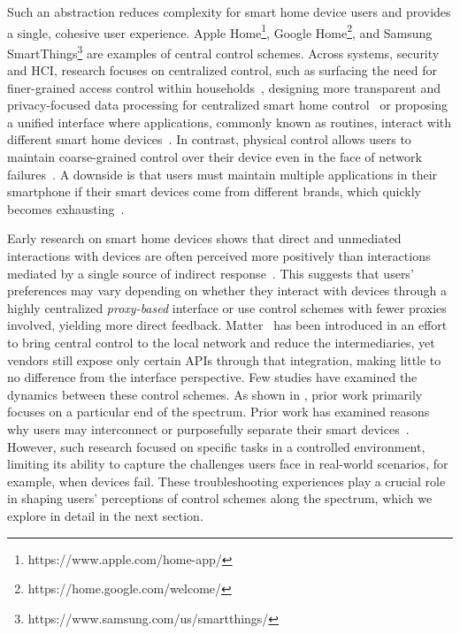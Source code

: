 Such an abstraction reduces complexity for smart home device users and provides a single, cohesive user experience. 
Apple Home\footnote{https://www.apple.com/home-app/}, Google Home\footnote{https://home.google.com/welcome/}, and Samsung SmartThings\footnote{https://www.samsung.com/us/smartthings/} are examples of central control schemes. Across systems, security and HCI, research focuses on centralized control, such as surfacing the need for finer-grained access control within households~\cite{sikder2022s}, designing more transparent and privacy-focused data processing for centralized smart home control~\cite{jin2022peekaboo} or proposing a unified interface where applications, commonly known as routines, interact with different smart home devices~\cite{HomeOS}.
{In contrast, physical control} allows users to maintain coarse-grained control over their device even in the face of network failures~\cite{geeng2019s}.
A downside is that users must maintain multiple applications in their smartphone if their smart devices come from different brands, which quickly becomes exhausting~\cite{wozniak2023inhabiting}.

Early research on smart home devices shows that direct and unmediated interactions with devices are often perceived more positively than interactions mediated by a single source of indirect response~\cite{lee2017companionship}. 
This suggests that users' preferences may vary depending on whether they interact with devices through a highly centralized \textit{proxy-based} interface or use control schemes with fewer proxies involved, yielding more direct feedback. {Matter~\cite{matter} has been introduced in an effort to bring central control to the local network and reduce the intermediaries, yet vendors still expose only certain APIs through that integration, making little to no difference from the interface perspective.}
Few studies have examined the dynamics between these control schemes. 
As shown in , prior work primarily focuses on a particular end of the spectrum.
Prior work has examined reasons why users may interconnect or purposefully separate their smart devices~\cite{wozniak2023inhabiting, shi2023investigating}. However, such research focused on specific tasks in a controlled environment, limiting its ability to capture the challenges users face in real-world scenarios, for example, when devices fail. These troubleshooting experiences play a crucial role in shaping users' perceptions of 
control schemes along the spectrum, which we explore in detail in the next section.

